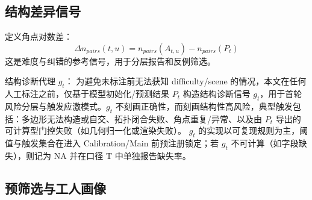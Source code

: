 \subsection{结构差异信号}

定义角点对数差：
\[\Delta n_{pairs}\left(t,u\right)=n_{pairs}\left(A_{t,u}\right)-n_{pairs}\left(P_t\right)\]
这是难度与纠错的参考信号，用于分层报告和反例筛选。

结构诊断代理 $g_t$：
为避免未标注前无法获知 difficulty/scene 的情况，本文在任何人工标注之前，仅基于模型初始化/预测结果 $P_t$ 构造结构诊断信号 $g_t$，用于首轮风险分层与触发应激模式。$g_t$ 不刻画正确性，而刻画结构性高风险，典型触发包括：多边形无法构造或自交、拓扑闭合失败、角点重复/异常、以及由 $P_t$ 导出的可计算型门控失败（如几何归一化或渲染失败）。
$g_t$ 的实现以可复现规则为主，阈值与触发集合在进入 Calibration/Main 前预注册锁定；若 $g_t$ 不可计算（如字段缺失），则记为 NA 并在口径 T 中单独报告缺失率。
\subsection{预筛选与工人画像}\label{sec:method-prescreen}

